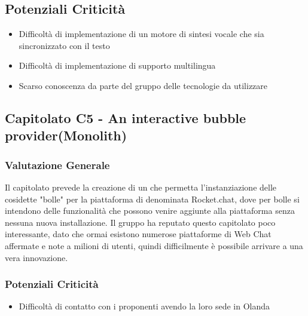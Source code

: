 \subsection{Potenziali Criticità}
 \begin{itemize}
 \item Difficoltà di implementazione di un motore di sintesi vocale che sia sincronizzato con il testo
 \item Difficoltà di implementazione di supporto multilingua
 \item Scarso conoscenza da parte del gruppo delle tecnologie da utilizzare
 \end{itemize}
    
\subsection{Capitolato C5 - An interactive bubble provider(Monolith)}
    \subsubsection{Valutazione Generale}
    Il capitolato prevede la creazione di un  che permetta l'instanziazione delle cosidette "bolle" per la piattaforma di  denominata Rocket.chat, dove per bolle si intendono delle funzionalità che possono venire aggiunte alla piattaforma senza nessuna nuova installazione.
    Il gruppo ha reputato questo capitolato poco interessante, dato che ormai esistono numerose piattaforme di Web Chat affermate e note a milioni di utenti, quindi difficilmente è possibile arrivare a una vera innovazione.
    \subsubsection{Potenziali Criticità}
    \begin{itemize}
     \item Difficoltà di contatto con i proponenti avendo la loro sede in Olanda     
    \end{itemize}
 